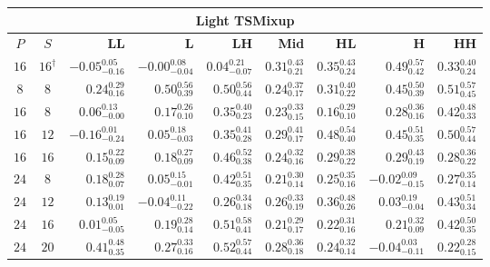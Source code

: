 \begin{table}[!tbp]
    \centering
    \color{red}\captionsetup{font+=probingred} %
    \small
    \setlength{\tabcolsep}{5pt}
    \begin{tabular}{@{}ccrrrrrrr@{}}
        \toprule
        \multicolumn{9}{c}{\textbf{Light TSMixup}} \\
        \midrule
        \textbf{$P$} & \textbf{$S$} & \textbf{LL} & \textbf{L} & \textbf{LH} & \textbf{Mid} & \textbf{HL} & \textbf{H} & \textbf{HH} \\
        \midrule
        $16$ & $16^{\dagger}$ & $-0.05_{-0.16}^{0.05}$ & $-0.00_{-0.04}^{0.08}$ & $0.04_{-0.07}^{0.21}$ & $0.31_{0.21}^{0.43}$ & $0.35_{0.24}^{0.43}$ & $0.49_{0.42}^{0.57}$ & $0.33_{0.24}^{0.40}$ \\
        \midrule
        \addlinespace[2pt]
        $8$ & $8$ & $0.24_{0.16}^{0.29}$ & $0.50_{0.39}^{0.56}$ & $0.50_{0.44}^{0.56}$ & $0.24_{0.17}^{0.37}$ & $0.31_{0.22}^{0.40}$ & $0.45_{0.39}^{0.50}$ & $0.51_{0.45}^{0.57}$ \\
        \addlinespace[2pt]
        $16$ & $8$ & $0.06_{-0.00}^{0.13}$ & $0.17_{0.10}^{0.26}$ & $0.35_{0.23}^{0.40}$ & $0.23_{0.15}^{0.33}$ & $0.16_{0.10}^{0.29}$ & $0.28_{0.16}^{0.36}$ & $0.42_{0.33}^{0.48}$ \\
        $16$ & $12$ & $-0.16_{-0.24}^{0.01}$ & $0.05_{-0.03}^{0.18}$ & $0.35_{0.28}^{0.41}$ & $0.29_{0.17}^{0.41}$ & $0.48_{0.40}^{0.54}$ & $0.45_{0.35}^{0.51}$ & $0.50_{0.44}^{0.57}$ \\
        $16$ & $16$ & $0.15_{0.09}^{0.22}$ & $0.18_{0.09}^{0.27}$ & $0.46_{0.38}^{0.52}$ & $0.24_{0.16}^{0.32}$ & $0.29_{0.22}^{0.38}$ & $0.29_{0.19}^{0.43}$ & $0.28_{0.22}^{0.36}$ \\
        \addlinespace[2pt]
        $24$ & $8$ & $0.18_{0.07}^{0.28}$ & $0.05_{-0.01}^{0.15}$ & $0.42_{0.35}^{0.51}$ & $0.21_{0.14}^{0.30}$ & $0.25_{0.16}^{0.35}$ & $-0.02_{-0.15}^{0.09}$ & $0.27_{0.14}^{0.35}$ \\
        $24$ & $12$ & $0.13_{0.01}^{0.19}$ & $-0.04_{-0.22}^{0.11}$ & $0.26_{0.18}^{0.34}$ & $0.26_{0.19}^{0.33}$ & $0.36_{0.26}^{0.48}$ & $0.03_{-0.04}^{0.19}$ & $0.43_{0.34}^{0.51}$ \\
        $24$ & $16$ & $0.01_{-0.05}^{0.05}$ & $0.19_{0.14}^{0.28}$ & $0.51_{0.41}^{0.58}$ & $0.21_{0.17}^{0.29}$ & $0.22_{0.16}^{0.31}$ & $0.21_{0.09}^{0.32}$ & $0.42_{0.35}^{0.50}$ \\
        $24$ & $20$ & $0.41_{0.35}^{0.48}$ & $0.27_{0.16}^{0.33}$ & $0.52_{0.44}^{0.57}$ & $0.28_{0.18}^{0.36}$ & $0.24_{0.14}^{0.32}$ & $-0.04_{-0.11}^{0.03}$ & $0.22_{0.15}^{0.28}$ \\

\end{tabular}
\end{table}
